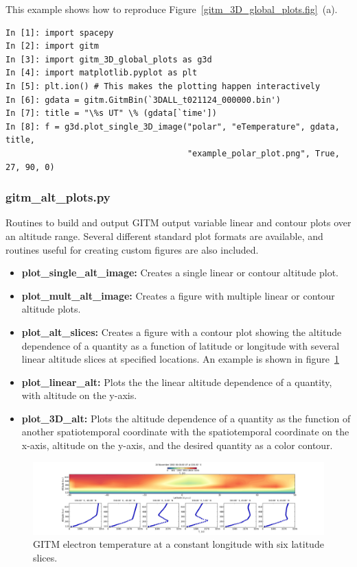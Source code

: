 This example shows how to reproduce Figure~\ref{gitm_3D_global_plots.fig}~(a).

\begin{verbatim}
In [1]: import spacepy
In [2]: import gitm
In [3]: import gitm_3D_global_plots as g3d
In [4]: import matplotlib.pyplot as plt
In [5]: plt.ion() # This makes the plotting happen interactively
In [6]: gdata = gitm.GitmBin(`3DALL_t021124_000000.bin')
In [7]: title = "\%s UT" \% (gdata[`time'])
In [8]: f = g3d.plot_single_3D_image("polar", "eTemperature", gdata, title, 
                                     "example_polar_plot.png", True, 27, 90, 0)
\end{verbatim}

\subsubsection{gitm\_alt\_plots.py}

Routines to build and output GITM output variable linear and contour plots over an altitude range.  Several different standard plot formats are available, and routines useful for creating custom figures are also included.

\begin{itemize}
\item[]{{\bf plot\_single\_alt\_image:}  Creates a single linear or contour altitude plot.}
\item[]{{\bf plot\_mult\_alt\_image:}  Creates a figure with multiple linear or contour altitude plots.}
\item[]{{\bf plot\_alt\_slices:}  Creates a figure with a contour plot showing the altitude dependence of a quantity as a function of latitude or longitude with several linear altitude slices at specified locations.  An example is shown in figure~\ref{gitm_alt_slices.fig}}
\item[]{{\bf plot\_linear\_alt:}  Plots the the linear altitude dependence of a quantity, with altitude on the y-axis.}
\item[]{{\bf plot\_3D\_alt:}  Plots the altitude dependence of a quantity as the function of another spatiotemporal coordinate with the spatiotemporal coordinate on the x-axis, altitude on the y-axis, and the desired quantity as a color contour.}
\end{itemize}

\begin{figure}
\begin{center}
\noindent\includegraphics[width=\textwidth]{Figures/gitm_alt_slice_test_Te.png}
\caption{GITM electron temperature at a constant longitude with six latitude slices.}
\label{gitm_alt_slices.fig}
\end{center}
\end{figure}

